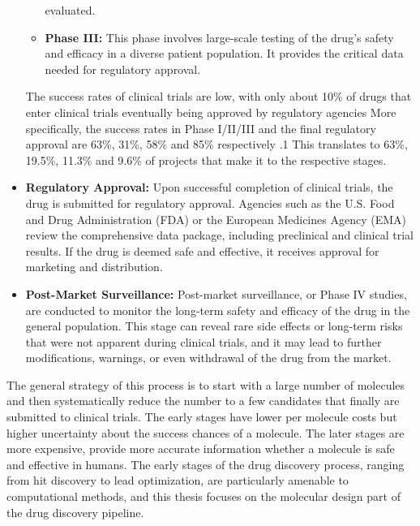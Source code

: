 \begin{itemize}
\begin{itemize}
                        evaluated.
                  \item \textbf{Phase III:} This phase involves large-scale testing of the drug's safety
                        and efficacy in a diverse patient population. It provides the critical data needed for
                        regulatory approval.
            \end{itemize}
            The success rates of clinical trials are low, with only about 10\% of drugs that enter clinical
            trials eventually being approved by regulatory agencies More specifically, the success rates in
            Phase I/II/III and the final regulatory approval are 63\%, 31\%, 58\% and 85\% respectively
            \citep{mullardParsingClinicalSuccess2016}.1
            This translates to 63\%, 19.5\%, 11.3\% and 9.6\% of projects that make it to the respective stages.
      \item \textbf{Regulatory Approval:} Upon successful completion of clinical trials, the drug is
            submitted for regulatory approval. Agencies such as the U.S. Food and Drug Administration
            (FDA) or the European Medicines Agency (EMA) review the comprehensive data package, including
            preclinical and clinical trial results. If the drug is deemed safe and effective, it receives
            approval for marketing and distribution.
      \item \textbf{Post-Market Surveillance:} Post-market surveillance, or Phase IV studies, are
            conducted to monitor the long-term safety and efficacy of the drug in the general population.
            This stage can reveal rare side effects or long-term risks that were not apparent during
            clinical trials, and it may lead to further modifications, warnings, or even withdrawal of the
            drug from the market.
\end{itemize}

The general strategy of this process is to start with a large number of molecules and then
systematically reduce the number to a few candidates that finally are submitted to clinical trials.
The early stages have lower per molecule costs but higher uncertainty about the success
chances of a molecule. The later stages are more expensive, provide more accurate information
whether a molecule is safe and effective in humans. The early stages of the
drug discovery process, ranging from hit discovery to lead optimization, are particularly amenable
to computational methods, and this thesis focuses on the molecular design part of the drug discovery
pipeline.

